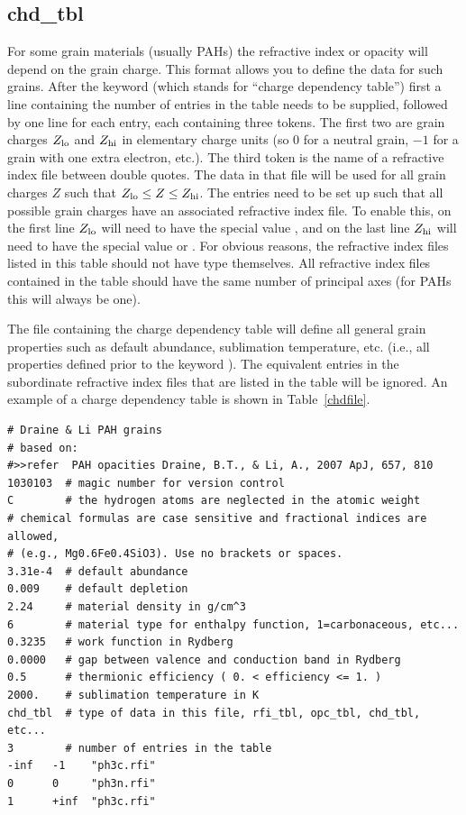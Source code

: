 \subsection{chd\_tbl}

For some grain materials (usually PAHs) the refractive index or opacity will
depend on the grain charge. This format allows you to define the data for such
grains. After the keyword  (which stands for ``charge
dependency table'') first a line containing the number of entries in the table
needs to be supplied, followed by one line for each entry, each containing three
tokens. The first two are grain charges $Z_{\rm lo}$ and $Z_{\rm hi}$ in
elementary charge units (so 0 for a neutral grain, $-1$ for a grain with one
extra electron, etc.). The third token is the name of a refractive index file
between double quotes. The data in that file will be used for all grain charges
$Z$ such that $Z_{\rm lo} \leq Z \leq Z_{\rm hi}$. The entries need to be set up
such that all possible grain charges have an associated refractive index file.
To enable this, on the first line $Z_{\rm lo}$ will need to have the special
value , and on the last line $Z_{\rm hi}$ will need to have the
special value  or . For obvious reasons, the
refractive index files listed in this table should not have type
 themselves. All refractive index files contained in the
table should have the same number of principal axes (for PAHs this will always
be one).

The file containing the charge dependency table will define all general grain
properties such as default abundance, sublimation temperature, etc. (i.e., all
properties defined prior to the keyword ). The equivalent
entries in the subordinate refractive index files that are listed in the table
will be ignored. An example of a charge dependency table is shown in
Table~\ref{chdfile}.

\begin{table}
\caption[Example of a charge dependency table.]
{Example of a charge dependency table ().}
\label{chdfile}
\begin{verbatim}
# Draine & Li PAH grains 
# based on: 
#>>refer  PAH opacities Draine, B.T., & Li, A., 2007 ApJ, 657, 810
1030103  # magic number for version control
C        # the hydrogen atoms are neglected in the atomic weight
# chemical formulas are case sensitive and fractional indices are allowed,
# (e.g., Mg0.6Fe0.4SiO3). Use no brackets or spaces.
3.31e-4  # default abundance
0.009    # default depletion
2.24     # material density in g/cm^3
6        # material type for enthalpy function, 1=carbonaceous, etc...
0.3235   # work function in Rydberg
0.0000   # gap between valence and conduction band in Rydberg
0.5      # thermionic efficiency ( 0. < efficiency <= 1. )
2000.    # sublimation temperature in K
chd_tbl  # type of data in this file, rfi_tbl, opc_tbl, chd_tbl, etc...
3        # number of entries in the table
-inf   -1    "ph3c.rfi"
0      0     "ph3n.rfi"
1      +inf  "ph3c.rfi"
\end{verbatim}
\end{table}

